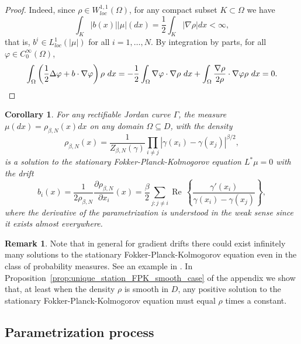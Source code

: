\documentclass[11pt]{article}
\renewcommand{\Re}{\operatorname{Re}\,}
\numberwithin{equation}{section}
\newtheorem{corollary}{Corollary}[theorem]
\theoremstyle{definition}
\newtheorem{remark}[theorem]{Remark}
\begin{document}
\begin{proof}
    Indeed, since  $\rho\in W_{loc}^{1,1}(\Omega)$, for any compact subset $K\subset\Omega$  we have $$\int_{K} |b(x)| |\mu|(dx) = \frac{1}{2}\int_{K} |\nabla\rho|dx<\infty,$$
that is, $b^{i}\in L^{1}_{loc}(|\mu|)$ for all $i=1,\dots,N$. By integration by parts, for all $\varphi\in C_{0}^{\infty}(\Omega)$,  
\[
    \int_{\Omega}\left(\frac{1}{2} \Delta \varphi+b \cdot \nabla\varphi\right)\rho \ dx 
    =-\frac{1}{2}\int_{\Omega}\nabla\varphi\cdot \nabla\rho\ dx 
    + \int_{\Omega} \frac{\nabla\rho}{2\rho}\cdot \nabla\varphi \rho \ dx = 0. \qedhere
\]
\end{proof} 
\begin{corollary}
For any rectifiable Jordan curve $\Gamma$, the measure $\mu(dx)=\rho_{\beta,N}(x)dx$ on any domain $\Omega\subseteq D$, with the density 
\[
    \rho_{\beta,N}(x) = \frac{1}{Z_{\beta, N}(\gamma)}\prod\limits_{i\neq j}|\gamma(x_{i})-\gamma(x_{j})|^{\beta/2},
\]
is a solution to the stationary Fokker-Planck-Kolmogorov equation $L^{*}\mu=0$ with the drift 
\[
b_{i}(x) 
= \frac{1}{2\rho_{\beta,N}}\frac{\partial\rho_{\beta,N}}{\partial x_{i}}(x) 
= \frac{\beta}{2}\sum\limits_{j:j\neq i}\Re\left\{\frac{\gamma'(x_{i})}{\gamma(x_{i})-\gamma(x_{j})}\right\}, 
\]
where the derivative of the parametrization is understood in the weak sense since it exists almost everywhere.
\end{corollary}
\begin{remark}
Note that in general for gradient drifts there could exist infinitely many solutions to the stationary Fokker-Planck-Kolmogorov equation even in the class of probability measures. See an example in \cite[p.790]{bogachev2010invariant}. In Proposition~\ref{prop:unique_station_FPK_smooth_case} of the appendix we show that, at least when the density $\rho$ is smooth in $D$, any positive solution to the stationary Fokker-Planck-Kolmogorov equation must equal $\rho$ times a constant. 
\end{remark}
\subsection{Parametrization process}
\end{document}
